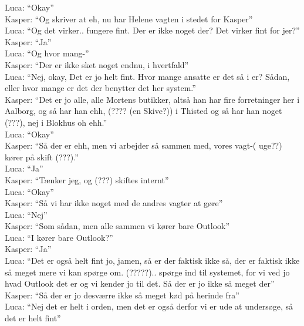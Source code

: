 Luca: “Okay”\\
Kasper: “Og skriver at eh, nu har Helene vagten i stedet for Kasper”\\
Luca: “Og det virker.. fungere fint. Der er ikke noget der? Det virker fint for jer?”\\
Kasper: “Ja”\\
Luca: “Og hvor mang-”\\
Kasper: “Der er ikke sket noget endnu, i hvertfald”\\
Luca: “Nej, okay, Det er jo helt fint. Hvor mange ansatte er det så i er? Sådan, eller hvor mange er det der benytter det her system.”\\
Kasper: “Det er jo alle, alle Mortens butikker, altså han har fire forretninger her i Aalborg, og så har han ehh, (???? (en Skive?)) i Thisted og så har han noget (???), nej i Blokhus oh ehh.”\\
Luca: “Okay”\\
Kasper: “Så der er ehh, men vi arbejder så sammen med, vores vagt-( uge??) kører på skift (???).”\\
Luca: “Ja”\\
Kasper: “Tænker jeg, og (???) skiftes internt”\\
Luca: “Okay”\\
Kasper: “Så vi har ikke noget med de andres vagter at gøre”\\
Luca: “Nej”\\
Kasper: “Som sådan, men alle sammen vi kører bare Outlook”\\
Luca: “I kører bare Outlook?”\\
Kasper: “Ja”\\
Luca: “Det er også helt fint jo, jamen, så er der faktisk ikke så, der er faktisk ikke så meget mere vi kan spørge om. (?????).. spørge ind til systemet, for vi ved jo hvad Outlook det er og vi kender jo til det. Så der er jo ikke så meget der”\\
Kasper: “Så der er jo desværre ikke så meget kød på herinde fra”\\
Luca: “Nej det er helt i orden, men det er også derfor vi er ude at undersøge, så det er helt fint”\\


